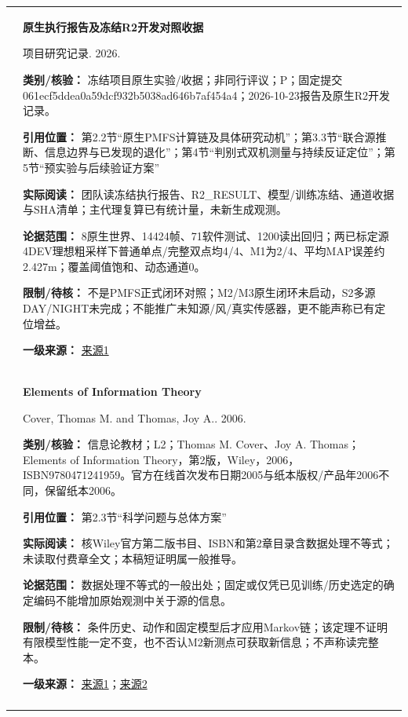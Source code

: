 \begin{longtable}{@{}>{\raggedright\arraybackslash}p{0.7cm}>{\raggedright\arraybackslash}p{14.8cm}@{}}
26 & \textbf{原生执行报告及冻结R2开发对照收据}\par 项目研究记录. 2026. \par\textbf{类别/核验：} 冻结项目原生实验/收据；非同行评议；P；固定提交061ecf5ddea0a59dcf932b5038ad646b7af454a4；2026-10-23报告及原生R2开发记录。\par\textbf{引用位置：} 第2.2节“原生PMFS计算链及具体研究动机”；第3.3节“联合源推断、信息边界与已发现的退化”；第4节“判别式双机测量与持续反证定位”；第5节“预实验与后续验证方案”\par\textbf{实际阅读：} 团队读冻结执行报告、R2\_RESULT、模型/训练冻结、通道收据与SHA清单；主代理复算已有统计量，未新生成观测。\par\textbf{论据范围：} 8原生世界、14424帧、71软件测试、1200读出回归；两已标定源4DEV理想粗采样下普通单点/完整双点均4/4、M1为2/4、平均MAP误差约2.427m；覆盖阈值饱和、动态通道0。\par\textbf{限制/待核：} 不是PMFS正式闭环对照；M2/M3原生闭环未启动，S2多源DAY/NIGHT未完成；不能推广未知源/风/真实传感器，更不能声称已有定位增益。\par\textbf{一级来源：} \href{https://github.com/kris-yun/uav-gsl-isj/blob/061ecf5ddea0a59dcf932b5038ad646b7af454a4/research/source_localization_v7/NATIVE_EXECUTION_REPORT_zh.md}{来源1} \\\addlinespace[6pt]
27 & \textbf{Elements of Information Theory}\par Cover, Thomas M. and Thomas, Joy A.. 2006. \par\textbf{类别/核验：} 信息论教材；L2；Thomas M. Cover、Joy A. Thomas；Elements of Information Theory，第2版，Wiley，2006，ISBN9780471241959。官方在线首次发布日期2005与纸本版权/产品年2006不同，保留纸本2006。\par\textbf{引用位置：} 第2.3节“科学问题与总体方案”\par\textbf{实际阅读：} 核Wiley官方第二版书目、ISBN和第2章目录含数据处理不等式；未读取付费章全文；本稿短证明属一般推导。\par\textbf{论据范围：} 数据处理不等式的一般出处；固定或仅凭已见训练/历史选定的确定编码不能增加原始观测中关于源的信息。\par\textbf{限制/待核：} 条件历史、动作和固定模型后才应用Markov链；该定理不证明有限模型性能一定不变，也不否认M2新测点可获取新信息；不声称读完整本。\par\textbf{一级来源：} \href{https://onlinelibrary.wiley.com/doi/book/10.1002/047174882X}{来源1}；\href{https://onlinelibrary.wiley.com/doi/abs/10.1002/047174882X.ch2}{来源2} \\\addlinespace[6pt]

\end{longtable}
